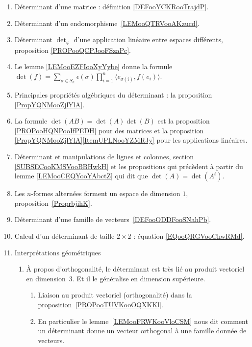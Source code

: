      \label{THMooUXJMooOroxbI}
\begin{enumerate}
	\item
	      Déterminant d'une matrice : définition \ref{DEFooYCKRooTrajdP}.
	\item
	      Déterminant d'un endomorphisme~\ref{LEMooQTRVooAKzucd}.
	\item
	      Déterminant \( \det_{\varphi}\) d'une application linéaire entre espaces différents, proposition \ref{PROPooQCPJooFSzaPc}.
	\item
	      Le lemme \ref{LEMooEZFIooXyYybe} donne la formule \( \det(f)=\sum_{\sigma\in S_n}\epsilon(\sigma)\prod_{i=1}^n\langle e_{\sigma(i)}, f(e_i)\rangle\).
	\item
	      Principales propriétés algébriques du déterminant : la proposition \ref{PropYQNMooZjlYlA}.
	\item
	      La formule \( \det(AB)=\det(A)\det(B)\) est la proposition \ref{PROPooHQNPooIfPEDH} pour des matrices et la proposition \ref{PropYQNMooZjlYlA}\ref{ItemUPLNooYZMRJy} pour les applications linéaires.
	\item
	      Déterminant et manipulations de lignes et colonnes, section \ref{SUBSECooKMSVooBBHwkH} et les propositions qui précèdent à partir du lemme \ref{LEMooCEQYooYAbctZ} qui dit que \( \det(A)=\det(A^t)\).
	\item
	      Les \( n\)-formes alternées forment un espace de dimension \( 1\), proposition~\ref{ProprbjihK}.
	\item
	      Déterminant d'une famille de vecteurs~\ref{DEFooODDFooSNahPb}.
	\item
	      Calcul d'un déterminant de taille \( 2\times 2\) : équation \eqref{EQooQRGVooChwRMd}.
	\item
	      Interprétations géométriques
	      \begin{enumerate}
		      \item
		            À propos d'orthogonalité, le déterminant est très lié au produit vectoriel en dimension~\( 3\). Et il le généralise en dimension supérieure.
		            \begin{enumerate}
			            \item
			                  Liaison au produit vectoriel (orthogonalité) dans la proposition~\ref{PROPooTUVKooOQXKKl}.
			            \item
			                  En particulier le lemme~\ref{LEMooFRWKooVloCSM} nous dit comment un déterminant donne un vecteur orthogonal à une famille donnée de vecteurs.

\end{enumerate}
\end{enumerate}
\end{enumerate}

